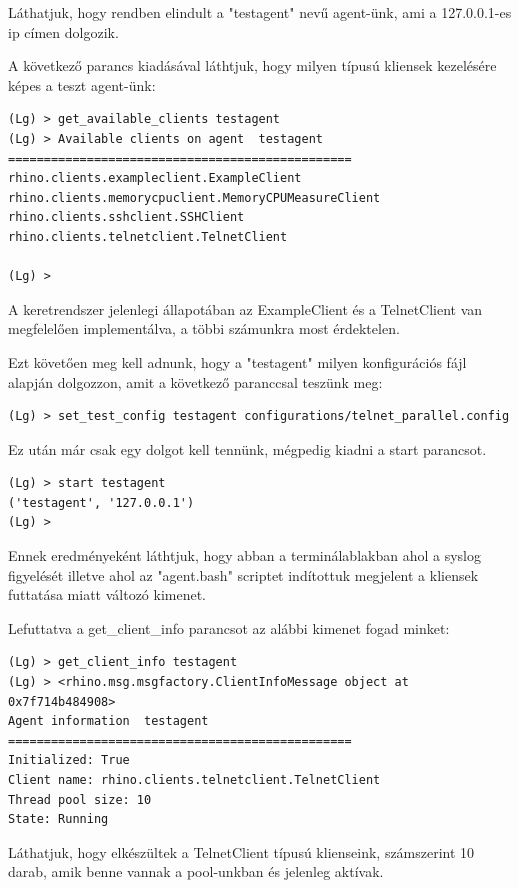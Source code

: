 \documentclass[a4paper,12pt,oneside]{report}
\begin{document}
\begin{enumerate}
Láthatjuk, hogy rendben elindult a "testagent" nevű agent-ünk, ami a 127.0.0.1-es ip címen dolgozik.

A következő parancs kiadásával láthtjuk, hogy milyen típusú kliensek kezelésére képes a teszt agent-ünk:
\begin{lstlisting}
(Lg) > get_available_clients testagent
(Lg) > Available clients on agent  testagent
================================================
rhino.clients.exampleclient.ExampleClient
rhino.clients.memorycpuclient.MemoryCPUMeasureClient
rhino.clients.sshclient.SSHClient
rhino.clients.telnetclient.TelnetClient

(Lg) > 

\end{lstlisting}

A keretrendszer jelenlegi állapotában az ExampleClient és a TelnetClient van megfelelően implementálva, a többi számunkra most érdektelen.

Ezt követően meg kell adnunk, hogy a "testagent" milyen konfigurációs fájl alapján dolgozzon, amit a következő paranccsal teszünk meg:
\begin{lstlisting}
(Lg) > set_test_config testagent configurations/telnet_parallel.config
\end{lstlisting}


Ez után már csak egy dolgot kell tennünk, mégpedig kiadni a start parancsot.
\begin{lstlisting}
(Lg) > start testagent
('testagent', '127.0.0.1')
(Lg) > 
\end{lstlisting}

Ennek eredményeként láthtjuk, hogy abban a terminálablakban ahol a syslog figyelését illetve ahol az "agent.bash" scriptet indítottuk megjelent a kliensek futtatása miatt változó kimenet.

Lefuttatva a get\_client\_info parancsot az alábbi kimenet fogad minket:
\begin{lstlisting}
(Lg) > get_client_info testagent
(Lg) > <rhino.msg.msgfactory.ClientInfoMessage object at 0x7f714b484908>
Agent information  testagent
================================================
Initialized: True
Client name: rhino.clients.telnetclient.TelnetClient
Thread pool size: 10
State: Running

\end{lstlisting}

Láthatjuk, hogy elkészültek a TelnetClient típusú klienseink, számszerint 10 darab, amik benne vannak a pool-unkban és jelenleg aktívak.


\end{enumerate}
\end{document}
